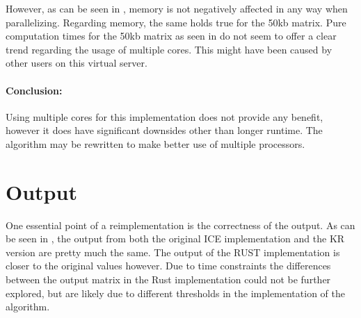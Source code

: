 


However, as can be seen in , memory is not negatively
affected in any way when parallelizing. Regarding memory, the same holds true for
the 50kb matrix. Pure computation times for the 50kb matrix as seen in
 do not seem to offer a clear trend regarding the usage of
multiple cores. This might have been caused by other users on this virtual server.


\paragraph{Conclusion:} Using multiple cores for this implementation does not
provide any benefit, however it does have significant downsides other than
longer runtime. The algorithm may be rewritten to make better use of multiple
processors.



\section{Output}



One essential point of a reimplementation is the correctness of the output.
As can be seen in , the output from both the original ICE
implementation and the KR version are pretty much the same. The output of the
RUST implementation is closer to the original values however. Due to time
constraints the differences between the output matrix in the Rust implementation
could not be further explored, but are likely due to different thresholds in
the implementation of the algorithm.






